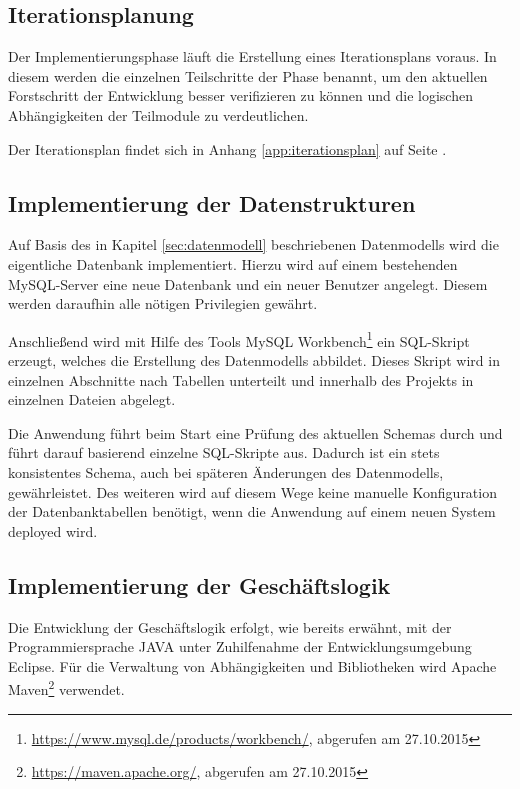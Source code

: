 \documentclass[12pt, xcolor=dvipsnames]{scrartcl}
\begin{document}
\subsection{Iterationsplanung}

Der Implementierungsphase läuft die Erstellung eines Iterationsplans voraus. In diesem werden die einzelnen Teilschritte der Phase benannt, um den aktuellen Forstschritt der Entwicklung besser verifizieren zu können und die logischen Abhängigkeiten der Teilmodule zu verdeutlichen.

Der Iterationsplan findet sich in Anhang \ref{app:iterationsplan} auf Seite \pageref{app:iterationsplan}.

\subsection{Implementierung der Datenstrukturen}

Auf Basis des in Kapitel \ref{sec:datenmodell} beschriebenen Datenmodells wird die eigentliche Datenbank implementiert. Hierzu wird auf einem bestehenden MySQL-Server eine neue Datenbank und ein neuer Benutzer angelegt. Diesem werden daraufhin alle nötigen Privilegien gewährt.

Anschließend wird mit Hilfe des Tools
MySQL Workbench\footnote{\url{https://www.mysql.de/products/workbench/}, abgerufen am 27.10.2015} ein SQL-Skript erzeugt, welches die Erstellung des Datenmodells abbildet. Dieses Skript wird in einzelnen Abschnitte nach Tabellen unterteilt und innerhalb des Projekts in einzelnen Dateien abgelegt.


Die Anwendung führt beim Start eine Prüfung des aktuellen Schemas durch und führt darauf basierend einzelne SQL-Skripte aus. Dadurch ist ein stets konsistentes Schema, auch bei späteren Änderungen des Datenmodells, gewährleistet. Des weiteren wird auf diesem Wege keine manuelle Konfiguration der Datenbanktabellen benötigt, wenn die Anwendung auf einem neuen System deployed wird.

\subsection{Implementierung der Geschäftslogik}

Die Entwicklung der Geschäftslogik erfolgt, wie bereits erwähnt, mit der Programmiersprache JAVA unter Zuhilfenahme der Entwicklungsumgebung Eclipse. Für die Verwaltung von Abhängigkeiten und Bibliotheken wird
Apache Maven\footnote{\url{https://maven.apache.org/}, abgerufen am 27.10.2015}
verwendet.
\end{document}
